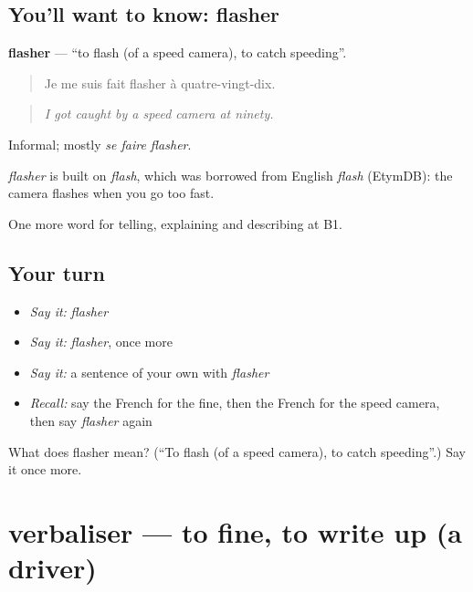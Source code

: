 \subsection*{You'll want to know: flasher}
\textbf{flasher} — \textquotedblleft{}to flash (of a speed camera), to catch speeding\textquotedblright{}.

\begin{quote}
Je me suis fait flasher à quatre-vingt-dix.
\end{quote}

\begin{quote}
\emph{I got caught by a speed camera at ninety.}
\end{quote}

Informal; mostly \emph{se faire flasher}.

\begin{cousinweb}
\emph{flasher} is built on \emph{flash}, which was borrowed from English \emph{flash} (EtymDB): the camera flashes when you go too fast.
\end{cousinweb}

\begin{grammarlens}[title={What you've built}]
One more word for telling, explaining and describing at B1.
\end{grammarlens}

\subsection*{Your turn}
\begin{itemize}
\raggedright
  \item \emph{Say it:} \emph{flasher}
  \item \emph{Say it:} \emph{flasher}, once more
  \item \emph{Say it:} a sentence of your own with \emph{flasher}
  \item \emph{Recall:} say the French for the fine, then the French for the speed camera, then say \emph{flasher} again
\end{itemize}

\begin{tcolorbox}[breakable,colback=teal!4,colframe=teal!35!black,title={Before you move on}]
What does flasher mean? (\textquotedblleft{}To flash (of a speed camera), to catch speeding\textquotedblright{}.) Say it once more.
\end{tcolorbox}
\section[verbaliser]{verbaliser — to fine, to write up (a driver)}

